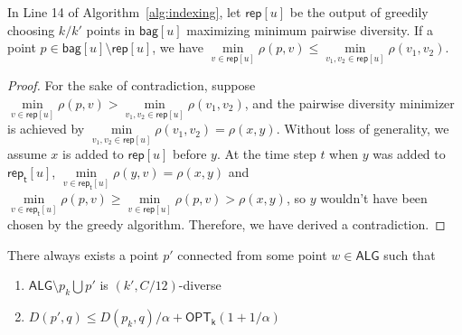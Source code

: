 \begin{proposition}\label{prop:greedy}
In Line 14 of Algorithm~\ref{alg:indexing}, let $\mathsf{rep}[u]$ be the output of greedily choosing $k/k'$ points in $\mathsf{bag}[u]$ maximizing minimum pairwise diversity. If a point $p\in \mathsf{bag}[u]\setminus \mathsf{rep}[u]$, we have $\min\limits_{v\in \mathsf{rep}[u]}\rho(p,v)\le \min\limits_{v_1,v_2\in \mathsf{rep}[u]}\rho(v_1,v_2)$.
\end{proposition}
\begin{proof}
For the sake of contradiction, suppose $\min\limits_{v\in \mathsf{rep}[u]}\rho(p,v)>\min\limits_{v_1,v_2\in \mathsf{rep}[u]}\rho(v_1,v_2)$, and the pairwise diversity minimizer is achieved by $\min\limits_{v_1,v_2\in \mathsf{rep}[u]}\rho(v_1,v_2)=\rho(x,y)$. Without loss of generality, we assume $x$ is added to $\mathsf{rep}[u]$ before $y$. At the time step $t$ when $y$ was added to $\mathsf{rep_t}[u]$, $\min\limits_{v\in \mathsf{rep_t}[u]}\rho(y,v)=\rho(x,y)$ and $\min\limits_{v\in \mathsf{rep_t}[u]}\rho(p,v)\ge \min\limits_{v\in \mathsf{rep}[u]}\rho(p,v)> \rho(x,y)$, so $y$ wouldn't have been chosen by the greedy algorithm. Therefore, we have derived a contradiction.
\end{proof}

\begin{lemma}\label{lm:update_diverse}
There always exists a point $p'$ connected from some point $w\in \mathsf{ALG}$ such that
\begin{enumerate}
\item $\mathsf{ALG}\setminus p_k \bigcup p'$ is $(k',C/12)$-diverse 
\item $D(p',q)\le D(p_k,q)/\alpha+\mathsf{OPT_k}(1+1/\alpha)$
\end{enumerate}
\end{lemma}

